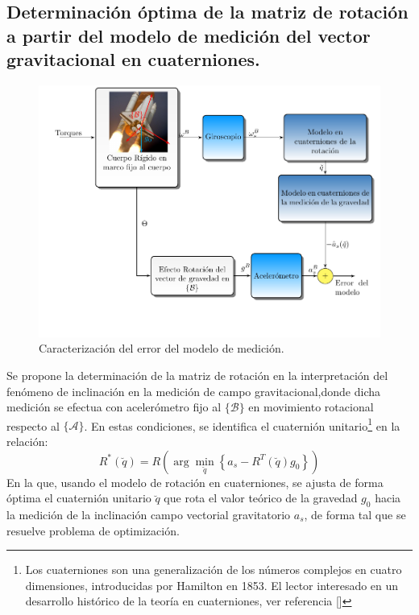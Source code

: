 \documentclass[conference]{IEEEtran}
\newcommand{\marco}[1]{\{\mathcal{#1}\}}
\begin{document}
\subsection{Determinación óptima de la matriz de rotación a partir del modelo de medición del vector gravitacional en cuaterniones.}
\begin{figure} [t]
\begin{center}
\includegraphics[scale=0.50,viewport=20 50 430 330,clip]{ObsOptimo_fig3.pdf}
\caption{Caracterización del error del modelo de medición.}
\label{ObsOptimo_fig2}
\end{center}
\end{figure}
Se propone la determinación de la matriz de rotación en la interpretación del fenómeno de inclinación en la medición de campo gravitacional,donde dicha medición se efectua con acelerómetro fijo al $\marco{B}$ en movimiento rotacional respecto al $\marco{A}$. En estas condiciones, se identifica el cuaternión unitario\footnote{Los cuaterniones son una generalización de los números complejos en cuatro dimensiones, introducidas por Hamilton en 1853. El lector interesado en un desarrollo histórico de la teoría en cuaterniones, ver referencia [\cite{Warden1976}]} en la relación: 
\begin{equation}\label{ProblemaOptimizacionAcc}
R^*(\breve{q})=R\left(\arg\min_{\breve{q}}\left\{a_s-R^T(\breve{q})g_0\right\}\right)
\end{equation} 
En la que, usando el modelo de rotación en cuaterniones, se ajusta de forma óptima el cuaternión unitario $\breve{q}$ que rota el valor teórico de la gravedad $g_0$ hacia la medición de la inclinación campo vectorial gravitatorio $a_s$, de forma tal que se resuelve problema de optimización.\par
\end{document}
